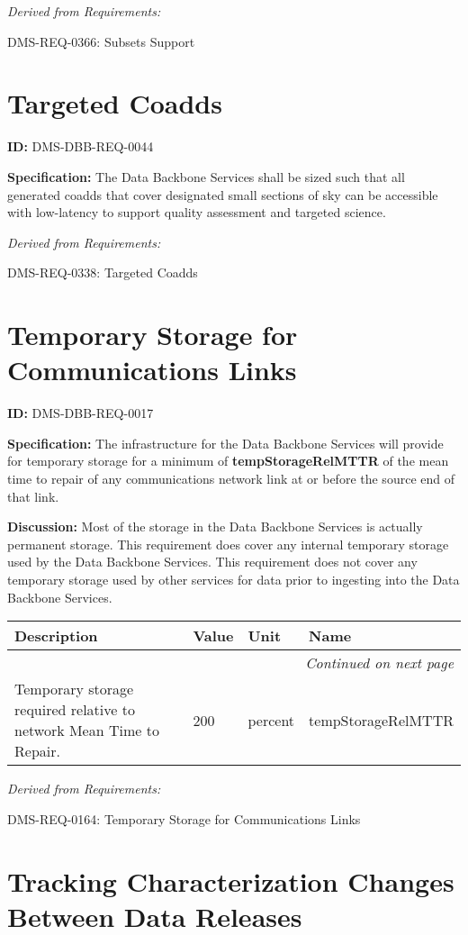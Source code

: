 \documentclass[SE,toc,lsstdraft]{lsstdoc}
\makeatletter
\newcommand{\paramname}[1]{\hspace{0pt}#1}
\newcommand{\unitname}[1]{\hspace{0pt}#1}
\newenvironment{parameters}[0]{%
\setlength\LTleft{0pt}
\setlength\LTright{\fill}
\begin{small}
\begin{longtable}[]{|p{0.49\textwidth}|l|p{0.6in}|p{1.70in}@{}|}

\hline \textbf{Description} & \textbf{Value} & \textbf{Unit} & \textbf{Name} \\ \hline
\endhead

\hline \multicolumn{4}{r}{\emph{Continued on next page}} \\
\endfoot

\hline\hline
\endlastfoot
}{%
\hline
\end{longtable}
\end{small}
}
\makeatother
\begin{document}
\emph{Derived from Requirements:}

DMS-REQ-0366:
Subsets Support \newline

\section{Targeted Coadds}

\label{DMS-DBB-REQ-0044}
\textbf{ID:} DMS-DBB-REQ-0044

\textbf{Specification:}
The Data Backbone Services shall be sized such that all generated coadds that cover designated small sections of sky can be accessible with low-latency to support quality assessment and targeted science.

\emph{Derived from Requirements:}

DMS-REQ-0338:
Targeted Coadds \newline

\section{Temporary Storage for Communications Links}

\label{DMS-DBB-REQ-0017}
\textbf{ID:} DMS-DBB-REQ-0017

\textbf{Specification:}
The infrastructure for the Data Backbone Services will provide for temporary storage for a minimum of \textbf{tempStorageRelMTTR} of the mean time to repair of any communications network link at or before the source end of that link.

\textbf{Discussion:}
Most of the storage in the Data Backbone Services is actually permanent storage.    This requirement does cover any internal temporary storage used by the Data Backbone Services.   This requirement does not cover any temporary storage used by other services for data prior to ingesting into the Data Backbone Services.

\begin{parameters}
Temporary storage required relative to network Mean Time to Repair.
&
200
&
\unitname{%
percent
}
&
\paramname{%
tempStorageRelMTTR
} \\\hline
\end{parameters}

\emph{Derived from Requirements:}

DMS-REQ-0164:
Temporary Storage for Communications Links \newline

\section{Tracking Characterization Changes Between Data Releases}
\end{document}

